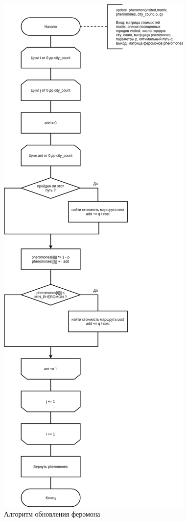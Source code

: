 \begin{figure}[H]
	\begin{center}
		\includegraphics[scale=0.4]{img/update.png}
	\end{center}
	\captionsetup{justification=centering}
	\caption{Алгоритм обновления феромона}
	\label{img:update}
\end{figure}

